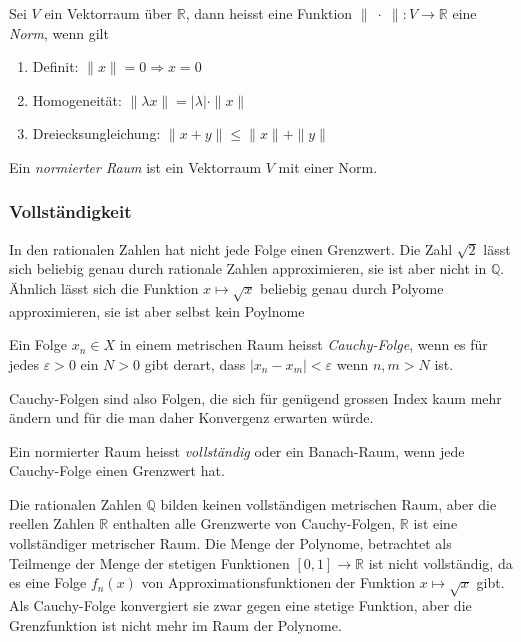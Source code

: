 \begin{definition}
\label{buch:skalaprodukt:funktionenraume:def:norm}
Sei $V$ ein Vektorraum über $\mathbb{R}$, dann heisst eine Funktion
\( \|\;\cdot\;\| \colon V \to \mathbb{R}\) eine {\em Norm}, wenn gilt
\begin{enumerate}
\item
Definit: $ \|x\| = 0 \Rightarrow x=0$
\item
Homogeneität: $ \| \lambda x \| = |\lambda| \cdot \|x\|$
\item
Dreiecksungleichung: $\|x+y\| \le \|x\| + \|y\|$
\end{enumerate}
Ein {\em normierter Raum} ist ein Vektorraum $V$ mit einer Norm.
\end{definition}

%
%
\subsubsection{Vollständigkeit}
In den rationalen Zahlen hat nicht jede Folge einen Grenzwert.
Die Zahl $\!\sqrt{2}$ lässt sich beliebig genau durch rationale Zahlen
approximieren, sie ist aber nicht in $\mathbb{Q}$.
Ähnlich lässt sich die Funktion $x\mapsto \!\sqrt{x}$ beliebig genau 
durch Polyome approximieren, sie ist aber selbst kein Poylnome

\begin{definition}
Ein Folge $x_n\in X$ in einem metrischen Raum heisst {\em Cauchy-Folge},
wenn es für jedes $\varepsilon>0$ ein $N>0$ gibt derart, dass 
$|x_n-x_m|<\varepsilon$ wenn $n,m>N$ ist.
\end{definition}

Cauchy-Folgen sind also Folgen, die sich für genügend grossen Index
kaum mehr ändern und für die man daher Konvergenz erwarten würde.

\begin{definition}
Ein normierter Raum heisst {\em vollständig} oder ein Banach-Raum,
wenn jede Cauchy-Folge einen Grenzwert hat.
\end{definition}

Die rationalen Zahlen $\mathbb{Q}$ bilden keinen vollständigen
metrischen Raum, aber die reellen Zahlen $\mathbb{R}$ enthalten
alle Grenzwerte von Cauchy-Folgen, $\mathbb{R}$ ist eine vollständiger
metrischer Raum.
Die Menge der Polynome, betrachtet als Teilmenge der Menge der
stetigen Funktionen $[0,1]\to\mathbb{R}$ ist nicht vollständig,
da es eine Folge $f_n(x)$ von Approximationsfunktionen der Funktion
$x\mapsto \!\sqrt{x}$ gibt.
Als Cauchy-Folge konvergiert sie zwar gegen eine stetige Funktion,
aber die Grenzfunktion ist nicht mehr im Raum der Polynome.


